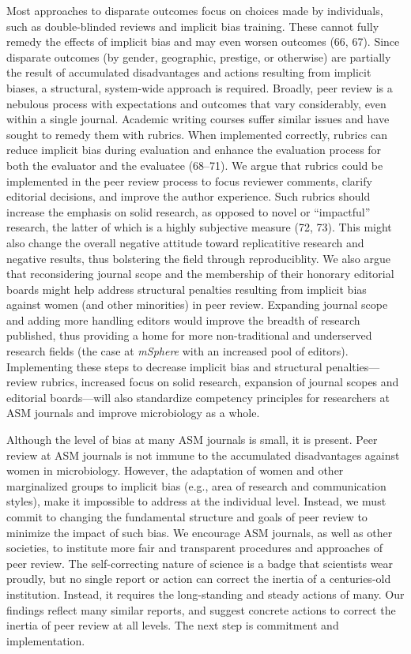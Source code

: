 \documentclass[11pt,]{article}
\begin{document}
Most approaches to disparate outcomes focus on choices made by
individuals, such as double-blinded reviews and implicit bias training.
These cannot fully remedy the effects of implicit bias and may even
worsen outcomes (66, 67). Since disparate outcomes (by gender,
geographic, prestige, or otherwise) are partially the result of
accumulated disadvantages and actions resulting from implicit biases, a
structural, system-wide approach is required. Broadly, peer review is a
nebulous process with expectations and outcomes that vary considerably,
even within a single journal. Academic writing courses suffer similar
issues and have sought to remedy them with rubrics. When implemented
correctly, rubrics can reduce implicit bias during evaluation and
enhance the evaluation process for both the evaluator and the evaluatee
(68--71). We argue that rubrics could be implemented in the peer review
process to focus reviewer comments, clarify editorial decisions, and
improve the author experience. Such rubrics should increase the emphasis
on solid research, as opposed to novel or ``impactful'' research, the
latter of which is a highly subjective measure (72, 73). This might also
change the overall negative attitude toward replicatitive research and
negative results, thus bolstering the field through reproduciblity. We
also argue that reconsidering journal scope and the membership of their
honorary editorial boards might help address structural penalties
resulting from implicit bias against women (and other minorities) in
peer review. Expanding journal scope and adding more handling editors
would improve the breadth of research published, thus providing a home
for more non-traditional and underserved research fields (the case at
\emph{mSphere} with an increased pool of editors). Implementing these
steps to decrease implicit bias and structural penalties---review
rubrics, increased focus on solid research, expansion of journal scopes
and editorial boards---will also standardize competency principles for
researchers at ASM journals and improve microbiology as a whole.

Although the level of bias at many ASM journals is small, it is present.
Peer review at ASM journals is not immune to the accumulated
disadvantages against women in microbiology. However, the adaptation of
women and other marginalized groups to implicit bias (e.g., area of
research and communication styles), make it impossible to address at the
individual level. Instead, we must commit to changing the fundamental
structure and goals of peer review to minimize the impact of such bias.
We encourage ASM journals, as well as other societies, to institute more
fair and transparent procedures and approaches of peer review. The
self-correcting nature of science is a badge that scientists wear
proudly, but no single report or action can correct the inertia of a
centuries-old institution. Instead, it requires the long-standing and
steady actions of many. Our findings reflect many similar reports, and
suggest concrete actions to correct the inertia of peer review at all
levels. The next step is commitment and implementation.
\end{document}
